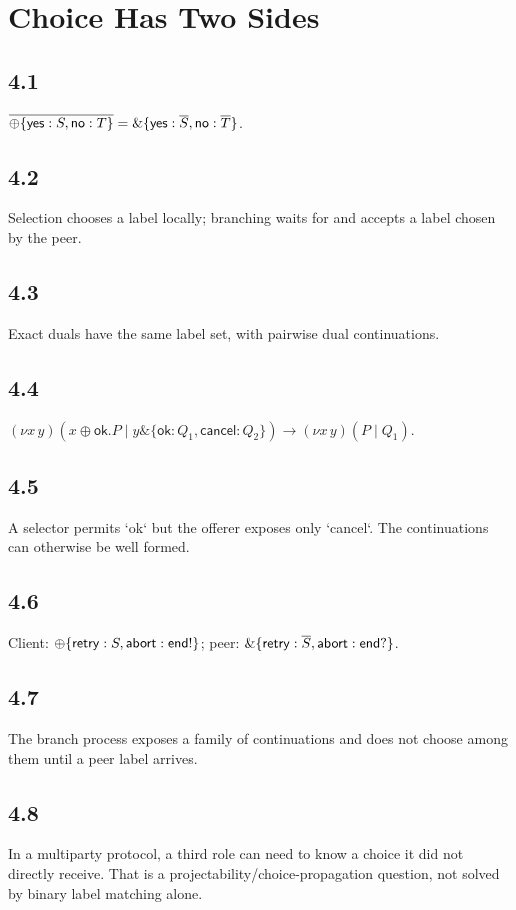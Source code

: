 \chapter{Choice Has Two Sides}

\section*{4.1}
$\overline{\oplus\{\mathsf{yes}:S,\mathsf{no}:T\}}=\mathbin{\&}\{\mathsf{yes}:\overline{S},\mathsf{no}:\overline{T}\}$.

\section*{4.2}
Selection chooses a label locally; branching waits for and accepts a label chosen by the peer.

\section*{4.3}
Exact duals have the same label set, with pairwise dual continuations.

\section*{4.4}
$(\nu x\,y)(x\oplus \mathsf{ok}.P\mid y\&\{\mathsf{ok}:Q_1,\mathsf{cancel}:Q_2\})\to(\nu x\,y)(P\mid Q_1)$.

\section*{4.5}
A selector permits `ok` but the offerer exposes only `cancel`. The continuations can otherwise be well formed.

\section*{4.6}
Client: $\oplus\{\mathsf{retry}:S,\mathsf{abort}:\mathsf{end!}\}$; peer: $\mathbin{\&}\{\mathsf{retry}:\overline{S},\mathsf{abort}:\mathsf{end?}\}$.

\section*{4.7}
The branch process exposes a family of continuations and does not choose among them until a peer label arrives.

\section*{4.8}
In a multiparty protocol, a third role can need to know a choice it did not directly receive. That is a projectability/choice-propagation question, not solved by binary label matching alone.

